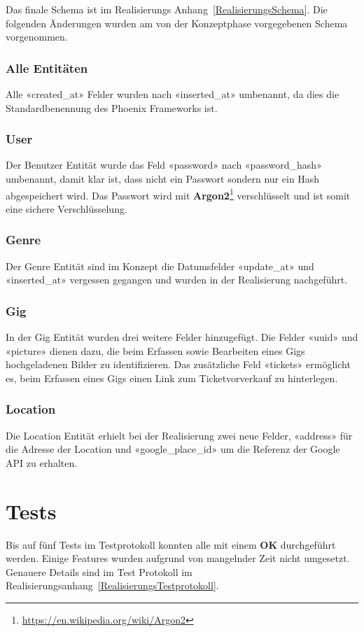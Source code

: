 Das finale Schema ist im Realisierungs Anhang~\ref{RealisierungsSchema}.
Die folgenden Änderungen wurden am von der Konzeptphase vorgegebenen Schema
vorgenommen.

\subsubsection{Alle Entitäten}
Alle «created\_at» Felder wurden nach «inserted\_at» umbenannt, da dies die
Standardbenennung des Phoenix Frameworks ist.

\subsubsection{User}
Der Benutzer Entität wurde das Feld «password» nach «password\_hash» umbenannt,
damit klar ist, dass nicht ein Passwort sondern nur ein Hash abgespeichert wird.
Das Passwort wird mit \textbf{Argon2}\footnote{\url{https://en.wikipedia.org/wiki/Argon2}}
verschlüsselt und ist somit eine sichere Verschlüsselung.

\subsubsection{Genre}
Der Genre Entität sind im Konzept die Datumsfelder «update\_at» und «inserted\_at»
vergessen gegangen und wurden in der Realisierung nachgeführt.

\subsubsection{Gig}\label{RealisierungSchemaGig}
In der Gig Entität wurden drei weitere Felder hinzugefügt.
Die Felder «uuid» und «picture» dienen dazu, die beim Erfassen sowie
Bearbeiten eines Gigs hochgeladenen Bilder zu identifizieren.
Das zusätzliche Feld «tickets» ermöglicht es, beim Erfassen eines Gigs
einen Link zum Ticketvorverkauf zu hinterlegen.

\subsubsection{Location}
Die Location Entität erhielt bei der Realisierung zwei neue Felder,
«address» für die Adresse der Location und
«google\_place\_id» um die Referenz der Google API zu erhalten.

\section{Tests}

Bis auf fünf Tests im Testprotokoll konnten alle mit einem \textbf{OK}
durchgeführt werden. Einige Features wurden aufgrund von mangelnder Zeit nicht
umgesetzt. Genauere Details sind im Test Protokoll im
Realisierungsanhang~\ref{RealisierungsTestprotokoll}.
